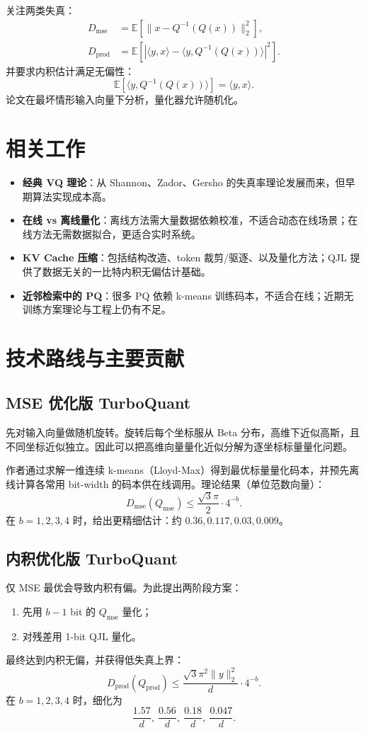 \documentclass[11pt]{ctexart}
\begin{document}
关注两类失真：
\begin{align}
D_{\text{mse}} &= \mathbb{E}\!\left[\|x-Q^{-1}(Q(x))\|_2^2\right], \\
D_{\text{prod}} &= \mathbb{E}\!\left[\left|\langle y,x\rangle-\langle y,Q^{-1}(Q(x))\rangle\right|^2\right].
\end{align}
并要求内积估计满足无偏性：
\[
\mathbb{E}\!\left[\langle y,Q^{-1}(Q(x))\rangle\right]=\langle y,x\rangle.
\]
论文在最坏情形输入向量下分析，量化器允许随机化。

\section{相关工作}
\begin{itemize}[leftmargin=1.6em]
  \item \textbf{经典 VQ 理论}：从 Shannon、Zador、Gersho 的失真率理论发展而来，但早期算法实现成本高。
  \item \textbf{在线 vs 离线量化}：离线方法需大量数据依赖校准，不适合动态在线场景；在线方法无需数据拟合，更适合实时系统。
  \item \textbf{KV Cache 压缩}：包括结构改造、token 裁剪/驱逐、以及量化方法；QJL 提供了数据无关的一比特内积无偏估计基础。
  \item \textbf{近邻检索中的 PQ}：很多 PQ 依赖 k-means 训练码本，不适合在线；近期无训练方案理论与工程上仍有不足。
\end{itemize}

\section{技术路线与主要贡献}
\subsection{MSE 优化版 TurboQuant}
先对输入向量做随机旋转。旋转后每个坐标服从 Beta 分布，高维下近似高斯，且不同坐标近似独立。因此可以把高维向量量化近似分解为逐坐标标量量化问题。

作者通过求解一维连续 k-means（Lloyd-Max）得到最优标量量化码本，并预先离线计算各常用 bit-width 的码本供在线调用。理论结果（单位范数向量）：
\[
D_{\text{mse}}(Q_{\text{mse}})\le \frac{\sqrt{3}\pi}{2}\cdot 4^{-b}.
\]
在 $b=1,2,3,4$ 时，给出更精细估计：约 $0.36, 0.117, 0.03, 0.009$。

\subsection{内积优化版 TurboQuant}
仅 MSE 最优会导致内积有偏。为此提出两阶段方案：
\begin{enumerate}[leftmargin=1.6em]
  \item 先用 $b-1$ bit 的 $Q_{\text{mse}}$ 量化；
  \item 对残差用 1-bit QJL 量化。
\end{enumerate}
最终达到内积无偏，并获得低失真上界：
\[
D_{\text{prod}}(Q_{\text{prod}})
\le
\frac{\sqrt{3}\pi^2\|y\|_2^2}{d}\cdot 4^{-b}.
\]
在 $b=1,2,3,4$ 时，细化为
\[
\frac{1.57}{d},\ \frac{0.56}{d},\ \frac{0.18}{d},\ \frac{0.047}{d}.
\]
\end{document}
